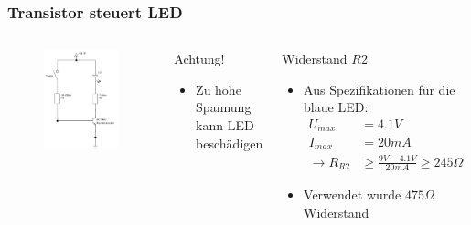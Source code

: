 \begin{frame}
    \frametitle{Transistor steuert LED}
    \begin{columns}[c]
        \begin{figure}[H]
        \begin{center}
                \includegraphics[scale=0.35]{./img/schaltungen/transistorLED_1.png}
        \end{center}
        \end{figure}
    \begin{alertblock}{Achtung!}
         \begin{itemize}
             \item Zu hohe Spannung kann LED beschädigen
         \end{itemize}
    \end{alertblock}
    \pause
    \begin{block}{Widerstand $R2$}
         \begin{itemize}
             \item Aus Spezifikationen für die blaue LED:
                \begin{align*}
                    U_{max} &= 4.1V \\
                    I_{max} &= 20mA \\
                    \rightarrow R_{R2} &\geq \frac{9V - 4.1V}{20mA}\geq245\Omega
                \end{align*}
             \item Verwendet wurde $475 \Omega$ Widerstand
         \end{itemize}
    \end{block}
    \end{columns}
\end{frame}

